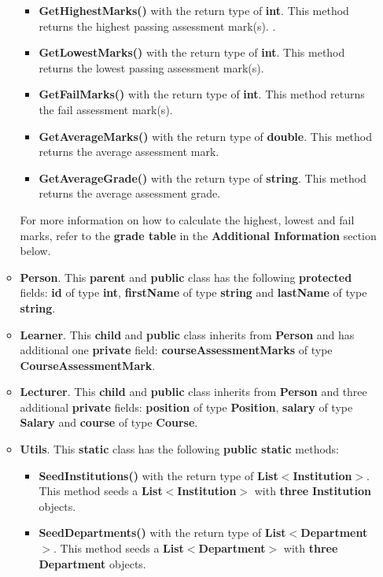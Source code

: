 \documentclass{article}
\begin{document}
\begin{itemize}
\begin{itemize}
\begin{itemize}
            \item \textbf{GetHighestMarks()} with the return type of \textbf{int}. This method returns the highest passing assessment mark(s). .
            \item \textbf{GetLowestMarks()} with the return type of \textbf{int}. This method returns the lowest passing assessment mark(s). 
            \item \textbf{GetFailMarks()} with the return type of \textbf{int}. This method returns the fail assessment mark(s).
            \item \textbf{GetAverageMarks()} with the return type of \textbf{double}. This method returns the average assessment mark.
            \item \textbf{GetAverageGrade()} with the return type of \textbf{string}. This method returns the average assessment grade.
        \end{itemize}
        For more information on how to calculate the highest, lowest and fail marks, refer to the \textbf{grade table} in the \textbf{Additional Information} section below.
        \item \textbf{Person}. This \textbf{parent} and \textbf{public} class has the following \textbf{protected} fields: \textbf{id} of type \textbf{int}, \textbf{firstName} of type \textbf{string} and \textbf{lastName} of type \textbf{string}.
        \item \textbf{Learner}. This \textbf{child} and \textbf{public} class inherits from \textbf{Person} and has additional one \textbf{private} field: \textbf{courseAssessmentMarks} of type \textbf{CourseAssessmentMark}.
        \item \textbf{Lecturer}. This \textbf{child} and \textbf{public} class inherits from \textbf{Person} and three additional \textbf{private} fields: \textbf{position} of type \textbf{Position}, \textbf{salary} of type \textbf{Salary} and \textbf{course} of type \textbf{Course}.
        \item \textbf{Utils}. This \textbf{static} class has the following \textbf{public static} methods:
        \begin{itemize}
            \item \textbf{SeedInstitutions()} with the return type of \textbf{List$<$Institution$>$}. This method seeds a \textbf{List$<$Institution$>$} with \textbf{three} \textbf{Institution} objects.
            \item \textbf{SeedDepartments()} with the return type of \textbf{List$<$Department$>$}. This method seeds a \textbf{List$<$Department$>$} with \textbf{three} \textbf{Department} objects.

\end{itemize}
\end{itemize}
\end{itemize}
\end{document}
